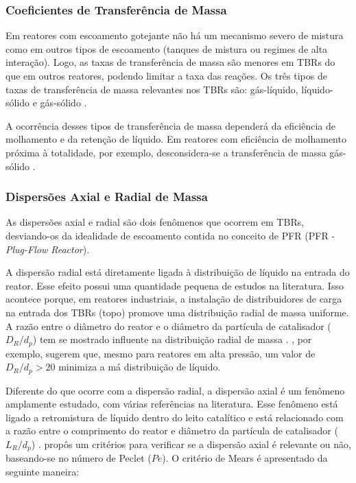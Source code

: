 
\subsubsection{Coeficientes de Transferência de Massa}
\label{sec:coeficientes}

Em reatores com escoamento gotejante não há um mecanismo severo de mistura como
em outros tipos de escoamento (tanques de mistura ou regimes de alta interação).
Logo, as taxas de transferência de massa são menores em TBRs do que em outros
reatores, podendo limitar a taxa das reações. Os três tipos de taxas de
transferência de massa relevantes nos TBRs são: gás-líquido, líquido-sólido e
gás-sólido \cite{Ranade2011}.

A ocorrência desses tipos de transferência de massa dependerá da eficiência de
molhamento e da retenção de líquido. Em reatores com eficiência de molhamento
próxima à totalidade, por exemplo, desconsidera-se a transferência de massa
gás-sólido \cite{Ranade2011}.

\subsubsection{Dispersões Axial e Radial de Massa}
\label{sec:dispersoes}

As dispersões axial e radial são dois fenômenos que ocorrem em TBRs,
desviando-os da idealidade de escoamento contida no conceito de PFR (PFR -
\emph{Plug-Flow Reactor}).


A dispersão radial está diretamente ligada à distribuição de líquido na entrada
do reator. Esse efeito possui uma quantidade pequena de estudos na literatura.
Isso acontece porque, em reatores industriais, a instalação de distribuidores de
carga na entrada dos TBRs (topo) promove uma distribuição radial de massa
uniforme. A razão entre o diâmetro do reator e o diâmetro da partícula de
catalisador ($D_R/d_p$) tem se mostrado influente na distribuição radial de
massa \cite{Saroha1998}. , por exemplo, sugerem que,
mesmo para reatores em alta pressão, um valor de $D_R/d_p > 20$ minimiza a má
distribuição de líquido.

Diferente do que ocorre com a dispersão radial, a dispersão axial é um fenômeno
amplamente estudado, com várias referências na literatura. Esse fenômeno está
ligado a retromistura de líquido dentro do leito catalítico e está relacionado
com a razão entre o comprimento do reator e diâmetro da partícula de catalisador
($L_R/d_p$) \cite{Ancheyta2011}. \cite{Mears1971b} propôs um critérios para
verificar se a dispersão axial é relevante ou não, baseando-se no número de
Peclet ($Pe$). O critério de Mears é apresentado da seguinte maneira:

